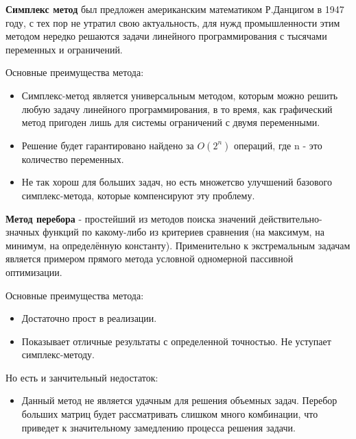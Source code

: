 \documentclass[../body.tex]{subfiles}
\begin{document}
		
	\textbf{Симплекс метод} был предложен американским математиком Р.Данцигом в 1947 году, с тех пор не утратил свою актуальность, для нужд промышленности этим методом нередко решаются задачи линейного программирования с тысячами переменных и ограничений. \\
	\vspace{\baselineskip}
	
	Основные преимущества метода:
	\begin{itemize}
		\item Симплекс-метод является универсальным методом, которым можно решить любую задачу линейного программирования, в то время, как графический метод пригоден лишь для системы ограничений с двумя переменными.
		\item Решение будет гарантировано найдено за $O(2^n)$ операций, где n - это количество переменных.
		\item Не так хорош для больших задач, но есть множетсво улучшений базового симплекс-метода, которые компенсируют эту проблему.
	\end{itemize}
\textbf{	Метод перебора }- простейший из методов поиска значений действительно-значных функций по какому-либо из критериев сравнения (на максимум, на минимум, на определённую константу). Применительно к экстремальным задачам является примером прямого метода условной одномерной пассивной оптимизации.\\
	\vspace{\baselineskip}
	
	Основные преимущества метода:
	\begin{itemize}
		\item Достаточно прост в реализации.
		\item Показывает отличные результаты с определенной точностью. Не уступает симплекс-методу.
	\end{itemize}

Но есть и занчительный недостаток:
\begin{itemize}
	\item Данный метод не является удачным для решения объемных задач. Перебор больших матриц будет рассматривать слишком много комбинации, что приведет к значительному замедлению процесса решения задачи.
\end{itemize}
	
\end{document}
